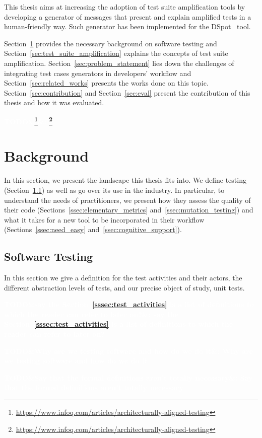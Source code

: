 \documentclass[a4paper,11pt]{sdm_internship}
\newcommand{\todo}[1]{\colorbox{Red!75}{\textcolor{white}{\textbf{TODO\ifx&#1&\else: #1\fi}}}}
\newcommand{\dspot}{DSpot\xspace}
\theoremstyle{definition}
\begin{document}
This thesis aims at increasing the adoption of test suite amplification tools by developing a generator of messages that present and explain amplified tests in a human-friendly way.
Such generator has been implemented for the \dspot{}~\cite{baudry2015dspot} tool.

Section~\ref{sec:background} provides the necessary background on software testing and Section~\ref{sec:test_suite_amplification} explains the concepts of test suite amplification.
Section~\ref{sec:problem_statement} lies down the challenges of integrating test cases generators in developers' workflow and Section~\ref{sec:related_works} presents the works done on this topic.
Section~\ref{sec:contribution} and Section~\ref{sec:eval} present the contribution of this thesis and how it was evaluated.

\todo{\footnote{\url{https://www.infoq.com/articles/architecturally-aligned-testing}}}


\section{Background}%
\label{sec:background}
In this section, we present the landscape this thesis fits into.
We define testing (Section~\ref{ssec:software_testing}) as well as go over its use in the industry.
In particular, to understand the needs of practitioners, we present how they assess the quality of their code (Sections~\ref{ssec:elementary_metrics} and~\ref{ssec:mutation_testing}) and what it takes for a new tool to be incorporated in their workflow (Sections~\ref{ssec:need_easy} and~\ref{ssec:cognitive_support}).

\subsection{Software Testing}%
\label{ssec:software_testing}
In this section we give a definition for the test activities and their actors, the different abstraction levels of tests, and our precise object of study, unit tests.

\todo{say the Section~\ref{sssec:test_activities} is a list of definitions to which the reader can refer to later on?}

\todo{Why are we testing software and how do we do it}

\todo{Say that the formal definitions aren't totally necessary}
\end{document}
